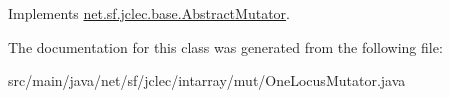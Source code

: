 Implements \hyperlink{classnet_1_1sf_1_1jclec_1_1base_1_1_abstract_mutator_acad18bae2458fe06812b321d43f3499e}{net.\-sf.\-jclec.\-base.\-Abstract\-Mutator}.



The documentation for this class was generated from the following file\-:\begin{DoxyCompactItemize}
\item 
src/main/java/net/sf/jclec/intarray/mut/One\-Locus\-Mutator.\-java\end{DoxyCompactItemize}
